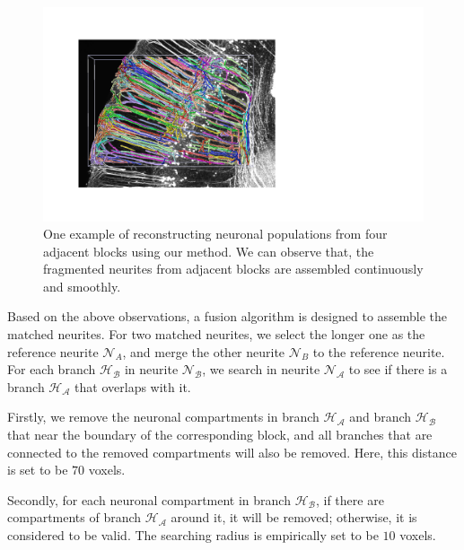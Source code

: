 \begin{figure}[t]
	\centering
	\includegraphics[width=1\columnwidth]{./Illustrations/trace_four_blocks2.pdf}
	\caption{One example of reconstructing neuronal populations from four adjacent blocks using our method. We can observe that, the fragmented neurites from adjacent blocks are assembled continuously and smoothly.}
	\label{fig:reconstruct_blocks}
\end{figure}

Based on the above observations, a fusion algorithm is designed to assemble the matched neurites.
For two matched neurites, we select the longer one as the reference neurite $\mathcal{N}_A$, and merge the other neurite $\mathcal{N}_B$ to the reference neurite.
%
For each branch $\mathcal{H_B}$ in neurite $\mathcal{N_B}$, we search in neurite $\mathcal{N_A}$ to see if there is a branch $\mathcal{H_A}$ that overlaps with it.
%

Firstly, we remove the neuronal compartments in branch $\mathcal{H_A}$ and branch $\mathcal{H_B}$ that near the boundary of the corresponding block, and all branches that are connected to the removed compartments will also be removed. Here, this distance is set to be $70$ voxels.

Secondly, for each neuronal compartment in branch $\mathcal{H_B}$, if there are compartments of branch $\mathcal{H_A}$ around it, it will be removed; otherwise, it is considered to be valid. The searching radius is empirically set to be $10$ voxels.


